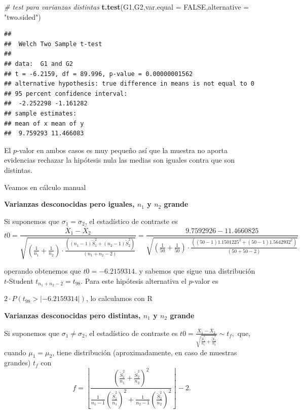 \documentclass[
]{article}
\newenvironment{Shaded}{\begin{snugshade}}{\end{snugshade}}
\newcommand{\CommentTok}[1]{\textcolor[rgb]{0.56,0.35,0.01}{\textit{#1}}}
\newcommand{\DataTypeTok}[1]{\textcolor[rgb]{0.13,0.29,0.53}{#1}}
\newcommand{\KeywordTok}[1]{\textcolor[rgb]{0.13,0.29,0.53}{\textbf{#1}}}
\newcommand{\NormalTok}[1]{#1}
\newcommand{\OtherTok}[1]{\textcolor[rgb]{0.56,0.35,0.01}{#1}}
\newcommand{\StringTok}[1]{\textcolor[rgb]{0.31,0.60,0.02}{#1}}
\begin{document}
\begin{Shaded}
\begin{Highlighting}[]
\CommentTok{\# test para varianzas distintas}
\KeywordTok{t.test}\NormalTok{(G1,G2,}\DataTypeTok{var.equal =} \OtherTok{FALSE}\NormalTok{,}\DataTypeTok{alternative =} \StringTok{"two.sided"}\NormalTok{)}
\end{Highlighting}
\end{Shaded}

\begin{verbatim}
## 
##  Welch Two Sample t-test
## 
## data:  G1 and G2
## t = -6.2159, df = 89.996, p-value = 0.00000001562
## alternative hypothesis: true difference in means is not equal to 0
## 95 percent confidence interval:
##  -2.252298 -1.161282
## sample estimates:
## mean of x mean of y 
##  9.759293 11.466083
\end{verbatim}

El \(p\)-valor en ambos casos es muy pequeño así que la muestra no
aporta evidencias rechazar la hipótesis nula las medias son iguales
contra que son distintas.

Veamos en cálculo manual

\textbf{Varianzas desconocidas pero iguales, \(n_1\) y \(n_2\) grande}

Si suponemos que \(\sigma_1=\sigma_2\), el estadístico de contraste es
\[
t0=\frac{\overline{X}_1-\overline{X}_2}
{\sqrt{(\frac1{n_1}+\frac1{n_2})\cdot 
\frac{((n_1-1)\widetilde{S}_1^2+(n_2-1)\widetilde{S}_2^2)}
{(n_1+n_2-2)}}}=\frac{9.7592926-11.4660825}
{\sqrt{(\frac1{50}+\frac1{50})\cdot 
\frac{((50-1) 1.1501225^2+(50-1)1.5642932^2)}
{(50+50-2)}}}
\]

operando obtenemos que \(t0=-6.2159314.\) y sabemos que sigue una
distribución \(t\)-Student \(t_{n_1+n_2-2}=t_{98}\). Para este hipótesis
alternativa el \(p\)-valor es

\(2\cdot P(t_{98}>|-6.2159314|)\), lo calculamos con R

\textbf{Varianzas desconocidas pero distintas, \(n_1\) y \(n_2\) grande}

Si suponemos que \(\sigma_1\neq \sigma_2\), el estadístico de contraste
es
\(t0=\frac{\overline{X}_1-\overline{X}_2}{\sqrt{\frac{\widetilde{S}_1^2}{n_1}+\frac{\widetilde{S}_2^2}{n_2}}}\sim t_f,\)
que, cuando \(\mu_1=\mu_2\), tiene distribución (aproximadamente, en
caso de muestras grandes) \(t_{f}\) con \[
f=\left\lfloor\frac{\displaystyle \left( \frac{\widetilde{S}_1^2}{n_1}+\frac{\widetilde{S}_2^2}{n_2}\right)^2}
{\displaystyle \frac1{n_1-1}\left(\frac{\widetilde{S}_1^2}{n_1}\right)^2+\frac1{n_2-1}\left(\frac{\widetilde{S}_2^2}{n_2}\right)^2}\right\rfloor -2.
\]
\end{document}
